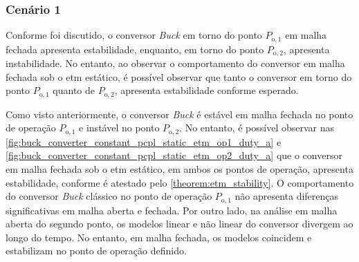 \subsubsection{Cenário 1}

Conforme foi discutido, o conversor \textit{Buck} em torno do ponto $P_{\mathrm{o}, 1}$ em malha fechada apresenta estabilidade, enquanto, em torno do ponto $P_{\mathrm{o}, 2}$, apresenta instabilidade. No entanto, ao observar o comportamento do conversor em malha fechada sob o \acrshort{etm} estático, é possível observar que tanto o conversor em torno do ponto $P_{\mathrm{o}, 1}$ quanto de $P_{\mathrm{o}, 2}$, apresenta estabilidade conforme esperado.

Como visto anteriormente, o conversor \textit{Buck} é estável em malha fechada no ponto de operação  $P_{\mathrm{o}, 1}$ e instável no ponto  $P_{\mathrm{o}, 2}$. No entanto, é possível observar nas \autoref{fig:buck_converter_constant_pcpl_static_etm_op1_duty_a} e \autoref{fig:buck_converter_constant_pcpl_static_etm_op2_duty_a} que o conversor em malha fechada sob o \acrshort{etm} estático, em ambos os pontos de operação,  apresenta estabilidade, conforme é atestado pelo \autoref{theorem:etm_stability}. O comportamento do conversor \textit{Buck} clássico no ponto de operação $P_{\mathrm{o}, 1}$ não apresenta diferenças significativas em malha aberta e fechada. Por outro lado, na análise em malha aberta do segundo ponto, os modelos linear e não linear do conversor divergem ao longo do tempo. No entanto, em malha fechada, os modelos coincidem e estabilizam no ponto de operação definido.

